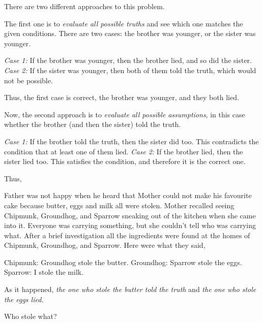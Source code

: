 \documentclass{article}
\begin{document}
\begin{soln}
    There are two different approaches to this problem.

    The first one is to \textit{evaluate all possible truths} and see which one matches the given conditions.
    There are two cases: the brother was younger, or the sister was younger.  
    \begin{itemize}[topsep=0pt, partopsep=0pt, itemsep=0pt]
        \ii \textit{Case 1:} If the brother was younger, then the brother lied, and so did the sister.
        \ii \textit{Case 2:} If the sister was younger, then both of them told the truth, which would not be possible.
    \end{itemize}    
    Thus, the first case is correct, the brother was younger, and they both lied.
    
    Now, the second approach is to \textit{evaluate all possible assumptions},
    in this case whether the brother (and then the sister) told the truth.
    \begin{itemize}[topsep=0pt, partopsep=0pt, itemsep=0pt]
        \ii \textit{Case 1:} If the brother told the truth, then the sister did too.
        This contradicts the condition that at least one of them lied.
        \ii \textit{Case 2:} If the brother lied, then the sister lied too.
        This satisfies the condition, and therefore it is the correct one.
    \end{itemize}    

    Thus, 
\end{soln}

\begin{example*}
    \label{example:pi-2022-4-p7}
    Father was not happy when he heard that Mother could not make his favourite cake because butter, eggs and milk all were stolen.
    Mother recalled seeing Chipmunk, Groundhog, and Sparrow sneaking out of the kitchen when she came into it.
    Everyone was carrying something, but she couldn't tell who was carrying what.
    After a brief investigation all the ingredients were found at the homes of Chipmunk, Groundhog, and Sparrow.
    Here were what they said,
    \begin{itemize}[topsep=0pt, partopsep=0pt, itemsep=0pt]
        \ii Chipmunk: Groundhog stole the butter.
        \ii Groundhog: Sparrow stole the eggs.
        \ii Sparrow: I stole the milk.
    \end{itemize}
    As it happened, \textit{the one who stole the butter told the truth} and \textit{the one who stole the eggs lied.}

    Who stole what?
\end{example*}
\end{document}
